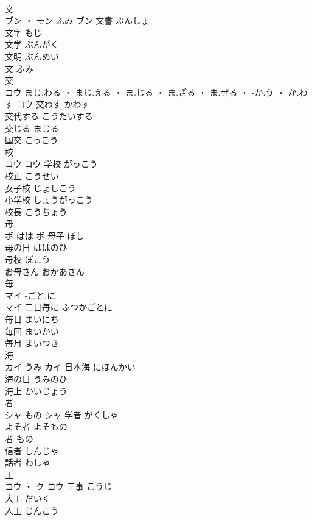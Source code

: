 \documentclass[8pt]{extreport}
\begin{document}
\begin{CJK}{UTF8}{min}
\\	文	
\\	ブン ・ モン	ふみ	ブン	文書	ぶんしょ	
\\	文字	もじ	
\\	文学	ぶんがく	
\\	文明	ぶんめい	
\\	文	ふみ	
\\	交	
\\	コウ	まじ.わる ・ まじ.える ・ ま.じる ・ ま.ざる ・ ま.ぜる ・ -か.う ・ か.わす	コウ	交わす	かわす	
\\	交代する	こうたいする	
\\	交じる	まじる	
\\	国交	こっこう	
\\	校	
\\	コウ		コウ	学校	がっこう	
\\	校正	こうせい	
\\	女子校	じょしこう	
\\	小学校	しょうがっこう	
\\	校長	こうちょう	
\\	母	
\\	ボ	はは	ボ	母子	ぼし	
\\	母の日	ははのひ	
\\	母校	ぼこう	
\\	お母さん	おかあさん	
\\	毎	
\\	マイ	-ごと.に
\\	マイ	二日毎に	ふつかごとに	
\\	毎日	まいにち	
\\	毎回	まいかい	
\\	毎月	まいつき	
\\	海	
\\	カイ	うみ	カイ	日本海	にほんかい	
\\	海の日	うみのひ	
\\	海上	かいじょう	
\\	者	
\\	シャ	もの	シャ	学者	がくしゃ	
\\	よそ者	よそもの	
\\	者	もの	
\\	信者	しんじゃ	
\\	話者	わしゃ	
\\	工	
\\	コウ ・ ク		コウ	工事	こうじ	
\\	大工	だいく	
\\	人工	じんこう	

\end{CJK}
\end{document}
